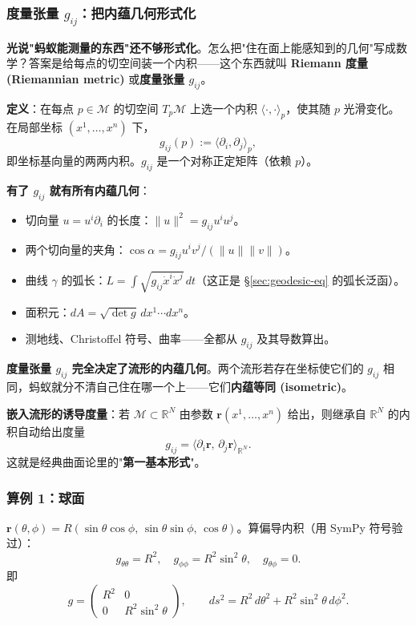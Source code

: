 \documentclass[11pt,a4paper]{article}
\theoremstyle{mythm}
\theoremstyle{mydef}
\newcommand{\R}{\mathbb{R}}
\begin{document}
\subsubsection*{度量张量 $g_{ij}$：把内蕴几何形式化}

\textbf{光说"蚂蚁能测量的东西"还不够形式化}。怎么把"住在面上能感知到的几何"写成数学？答案是给每点的切空间装一个内积——这个东西就叫 \textbf{Riemann 度量 (Riemannian metric)} 或\textbf{度量张量 $g_{ij}$}。

\textbf{定义}：在每点 $p \in \mathcal{M}$ 的切空间 $T_p\mathcal{M}$ 上选一个内积 $\langle \cdot, \cdot \rangle_p$，使其随 $p$ 光滑变化。在局部坐标 $(x^1, \dots, x^n)$ 下，
$$g_{ij}(p) := \langle \partial_i, \partial_j\rangle_p,$$
即坐标基向量的两两内积。$g_{ij}$ 是一个对称正定矩阵（依赖 $p$）。

\textbf{有了 $g_{ij}$ 就有所有内蕴几何}：
\begin{itemize}[leftmargin=2em]
\item 切向量 $u = u^i \partial_i$ 的长度：$\|u\|^2 = g_{ij} u^i u^j$。
\item 两个切向量的夹角：$\cos\alpha = g_{ij} u^i v^j / (\|u\|\|v\|)$。
\item 曲线 $\gamma$ 的弧长：$L = \int \sqrt{g_{ij}\dot x^i \dot x^j}\, dt$（这正是 §\ref{sec:geodesic-eq} 的弧长泛函）。
\item 面积元：$dA = \sqrt{\det g}\, dx^1 \cdots dx^n$。
\item 测地线、Christoffel 符号、曲率——全都从 $g_{ij}$ 及其导数算出。
\end{itemize}

\begin{tcolorbox}[colback=blue!3,colframe=blue!50!black]
\textbf{度量张量 $g_{ij}$ 完全决定了流形的内蕴几何}。两个流形若存在坐标使它们的 $g_{ij}$ 相同，蚂蚁就分不清自己住在哪一个上——它们\textbf{内蕴等同 (isometric)}。
\end{tcolorbox}

\textbf{嵌入流形的诱导度量}：若 $\mathcal{M} \subset \R^N$ 由参数 $\mathbf{r}(x^1,\dots,x^n)$ 给出，则继承自 $\R^N$ 的内积自动给出度量
$$g_{ij} = \big\langle \partial_i \mathbf{r},\, \partial_j \mathbf{r}\big\rangle_{\R^N}.$$
这就是经典曲面论里的"\textbf{第一基本形式}"。

\subsubsection*{算例 1：球面}
$\mathbf{r}(\theta, \phi) = R(\sin\theta\cos\phi,\,\sin\theta\sin\phi,\,\cos\theta)$。算偏导内积（用 SymPy 符号验过）：
$$g_{\theta\theta} = R^2,\quad g_{\phi\phi} = R^2\sin^2\theta,\quad g_{\theta\phi} = 0.$$
即
$$g = \begin{pmatrix}R^2 & 0\\ 0 & R^2\sin^2\theta\end{pmatrix},\qquad ds^2 = R^2\,d\theta^2 + R^2\sin^2\theta\,d\phi^2.$$
\end{document}
